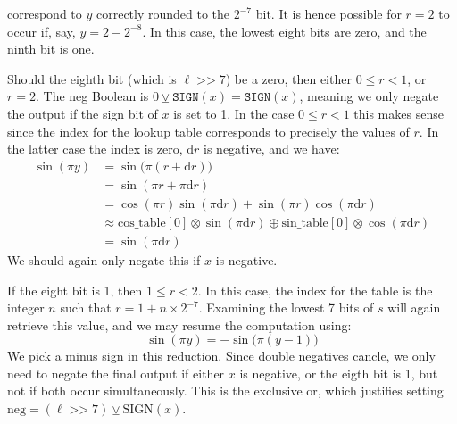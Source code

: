 \documentclass{article}
\theoremstyle{plain}
\begin{document}
        correspond to $y$ correctly rounded to the $2^{-7}$ bit. It is hence
        possible for $r=2$ to occur if, say, $y=2-2^{-8}$. In this case, the
        lowest eight bits are zero, and the ninth bit is one.
        \par\hfill\par
        Should the eighth bit (which is $\ell\;\texttt{>>}\;7$)
        be a zero, then either $0\leq{r}<1$, or $r=2$.
        The \textrm{neg} Boolean is $0\veebar\texttt{SIGN}(x)=\texttt{SIGN}(x)$,
        meaning we only negate the output if the sign bit of $x$ is set to 1.
        In the case $0\leq{r}<1$ this makes sense since the index for the
        lookup table corresponds to precisely the values of $r$.
        In the latter case the index is zero, $\textrm{d}r$ is negative,
        and we have:
        \begin{align}
            \sin(\pi{y})
            &=\sin\Big(\pi(r+\textrm{d}r)\Big)\\
            &=\sin(\pi{r}+\pi\textrm{d}r)\\
            &=\cos(\pi{r})\sin(\pi\textrm{d}r)
                +\sin(\pi{r})\cos(\pi\textrm{d}r)\\
            &\approx
            \textrm{cos\_table}[0]\otimes\sin(\pi\textrm{d}r)
                \oplus
                \textrm{sin\_table}[0]\otimes\cos(\pi\textrm{d}r)\\
            &=\sin(\pi\textrm{d}r)
        \end{align}
        We should again only negate this if $x$ is negative.
        \par\hfill\par
        If the eight bit is 1, then $1\leq{r}<2$. In this case, the index for
        the table is the integer $n$ such that $r=1+n\times{2}^{-7}$. Examining
        the lowest 7 bits of $s$ will again retrieve this value, and we may
        resume the computation using:
        \begin{equation}
            \sin(\pi{y})=-\sin\Big(\pi(y-1)\Big)
        \end{equation}
        We pick a minus sign in this reduction. Since double negatives cancle,
        we only need to negate the final output if either $x$ is negative,
        or the eigth bit is 1, but not if both occur simultaneously. This is
        the exclusive or, which justifies setting
        $\textrm{neg}=(\ell\;\texttt{>>}\;7)\veebar\textrm{SIGN}(x)$.
        \par\hfill\par
\end{document}
